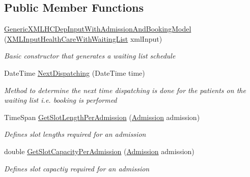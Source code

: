 \subsection*{Public Member Functions}
\begin{DoxyCompactItemize}
\item 
\hyperlink{class_general_health_care_elements_1_1_input_1_1_generic_x_m_l_h_c_dep_input_with_admission_and_booking_model_a0f414f5d189419caaa144a0895985474}{Generic\+X\+M\+L\+H\+C\+Dep\+Input\+With\+Admission\+And\+Booking\+Model} (\hyperlink{class_general_health_care_elements_1_1_input_1_1_x_m_l_input_health_care_with_waiting_list}{X\+M\+L\+Input\+Health\+Care\+With\+Waiting\+List} xml\+Input)
\begin{DoxyCompactList}\small\item\em Basic constructor that generates a waiting list schedule \end{DoxyCompactList}\item 
Date\+Time \hyperlink{class_general_health_care_elements_1_1_input_1_1_generic_x_m_l_h_c_dep_input_with_admission_and_booking_model_a2dcd90642127d932cee2ed4c32d761c2}{Next\+Dispatching} (Date\+Time time)
\begin{DoxyCompactList}\small\item\em Method to determine the next time dispatching is done for the patients on the waiting list i.\+e. booking is performed \end{DoxyCompactList}\item 
Time\+Span \hyperlink{class_general_health_care_elements_1_1_input_1_1_generic_x_m_l_h_c_dep_input_with_admission_and_booking_model_a59719fa103510c86e979c7d861975dfb}{Get\+Slot\+Length\+Per\+Admission} (\hyperlink{class_general_health_care_elements_1_1_treatment_admission_types_1_1_admission}{Admission} admission)
\begin{DoxyCompactList}\small\item\em Defines slot lengths required for an admission \end{DoxyCompactList}\item 
double \hyperlink{class_general_health_care_elements_1_1_input_1_1_generic_x_m_l_h_c_dep_input_with_admission_and_booking_model_ac5453c19851e04e4bb3c2bdfd3ae8f9d}{Get\+Slot\+Capacity\+Per\+Admission} (\hyperlink{class_general_health_care_elements_1_1_treatment_admission_types_1_1_admission}{Admission} admission)
\begin{DoxyCompactList}\small\item\em Defines slot capactiy required for an admission \end{DoxyCompactList}\item 

\end{DoxyCompactItemize}
